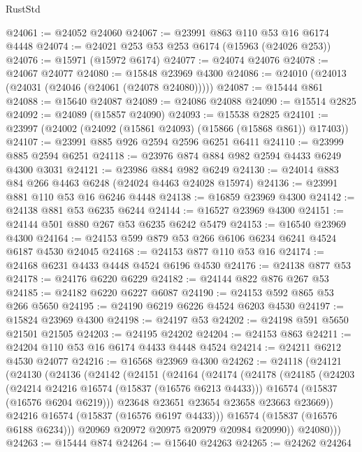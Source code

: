 \begin{lexlean}{RustStd}
\begin{coremodule}
@24061 := @24052 @24060
@24067 := @23991 @863 @110 @53 @16 @6174 @4448
@24074 := @24021 @253 @53 @253 @6174 (@15963 (@24026 @253))
@24076 := @15971 (@15972 @6174)
@24077 := @24074 @24076
@24078 := @24067 @24077
@24080 := @15848 @23969 @4300
@24086 := @24010 (@24013 (@24031 (@24046 (@24061 (@24078 @24080)))))
@24087 := @15444 @861
@24088 := @15640 @24087
@24089 := @24086 @24088
@24090 := @15514 @2825
@24092 := @24089 (@15857 @24090)
@24093 := @15538 @2825
@24101 := @23997 (@24002 (@24092 (@15861 @24093) (@15866 (@15868 @861)) @17403))
@24107 := @23991 @885 @926 @2594 @2596 @6251 @6411
@24110 := @23999 @885 @2594 @6251
@24118 := @23976 @874 @884 @982 @2594 @4433 @6249 @4300 @3031
@24121 := @23986 @884 @982 @6249
@24130 := @24014 @883 @84 @266 @4463 @6248 (@24024 @4463 @24028 @15974)
@24136 := @23991 @881 @110 @53 @16 @6246 @4448
@24138 := @16859 @23969 @4300
@24142 := @24138 @881 @53 @6235 @6244
@24144 := @16527 @23969 @4300
@24151 := @24144 @501 @880 @267 @53 @6235 @6242 @5479
@24153 := @16540 @23969 @4300
@24164 := @24153 @599 @879 @53 @266 @6106 @6234 @6241 @4524 @6187 @4530 @24045
@24168 := @24153 @877 @110 @53 @16
@24174 := @24168 @6231 @4433 @4448 @4524 @6196 @4530
@24176 := @24138 @877 @53
@24178 := @24176 @6220 @6229
@24182 := @24144 @822 @876 @267 @53
@24185 := @24182 @6220 @6227 @6087
@24190 := @24153 @592 @865 @53 @266 @5650
@24195 := @24190 @6219 @6226 @4524 @6203 @4530
@24197 := @15824 @23969 @4300
@24198 := @24197 @53
@24202 := @24198 @591 @5650 @21501 @21505
@24203 := @24195 @24202
@24204 := @24153 @863
@24211 := @24204 @110 @53 @16 @6174 @4433 @4448 @4524
@24214 := @24211 @6212 @4530 @24077
@24216 := @16568 @23969 @4300
@24262 := @24118
    (@24121
      (@24130
        (@24136
          (@24142
            (@24151
              (@24164
                (@24174
                  (@24178
                    (@24185
                      (@24203
                        (@24214 @24216 @16574 (@15837 (@16576 @6213 @4433)))
                        @16574
                        (@15837 (@16576 @6204 @6219)))
                      @23648
                      @23651
                      @23654
                      @23658
                      @23663
                      @23669))
                  @24216
                  @16574
                  (@15837 (@16576 @6197 @4433)))
                @16574
                (@15837 (@16576 @6188 @6234)))
              @20969
              @20972
              @20975
              @20979
              @20984
              @20990))
          @24080)))
@24263 := @15444 @874
@24264 := @15640 @24263
@24265 := @24262 @24264

\end{coremodule}
\end{lexlean}
